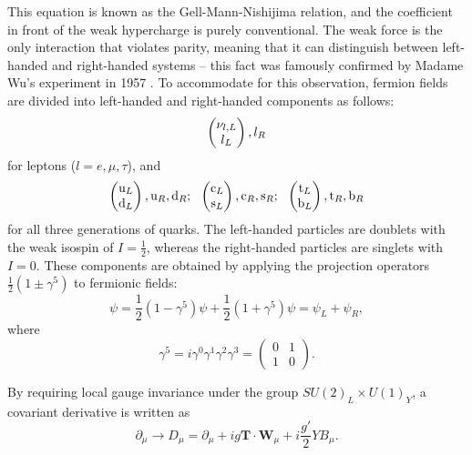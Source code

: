 This equation is known as the Gell-Mann-Nishijima relation, and the coefficient in front of the weak hypercharge is
purely conventional. The weak force is the only interaction that violates parity, meaning that it can distinguish
between left-handed and right-handed systems -- this fact was famously confirmed by Madame Wu's experiment in 1957
\autocite{Madame_Wu}. To accommodate for this observation, fermion fields are divided into left-handed and right-handed
components as follows:
\begin{equation}
\begin{pmatrix} \nu_{l,L} \\ l_L \end{pmatrix}, l_R
\label{eq:lepton_EWK_fields}
\end{equation} 
for leptons ($l = e, \mu, \tau$), and
\begin{equation}
\begin{pmatrix} \mathrm{u}_L \\ \mathrm{d}_L \end{pmatrix}, \mathrm{u}_R, \mathrm{d}_R; ~~ \begin{pmatrix} \mathrm{c}_L \\ \mathrm{s}_L \end{pmatrix}, \mathrm{c}_R, \mathrm{s}_R; ~~
\begin{pmatrix} \mathrm{t}_L \\ \mathrm{b}_L \end{pmatrix}, \mathrm{t}_R, \mathrm{b}_R
\label{eq:quark_EWK_fields}
\end{equation} 
for all three generations of quarks. The left-handed particles are doublets with the weak isospin of $I = \frac{1}{2}$,
whereas the right-handed particles are singlets with $I = 0$. These components are obtained by applying the projection
operators $\frac{1}{2}(1\pm\gamma^5)$ to fermionic fields:
\begin{equation}
\psi = \frac{1}{2}(1-\gamma^5) \psi + \frac{1}{2}(1 + \gamma^5)\psi = \psi_L +  \psi_R,
\end{equation} 
where
\begin{equation}
\gamma^5 = i \gamma^0  \gamma^1  \gamma^2  \gamma^3 = \begin{pmatrix}
0 & 1\\
1 & 0
\end{pmatrix}.
\end{equation}

By requiring local gauge invariance under the group $SU(2)_L \times U(1)_Y$, a covariant derivative is written as
\begin{equation}
\partial_\mu \rightarrow D_\mu = \partial_\mu + i g \mathbf{T} \cdot \mathbf{W}_\mu + i \frac{g'}{2} Y B_\mu.
\label{eq:D_mu_EWK}
\end{equation}

